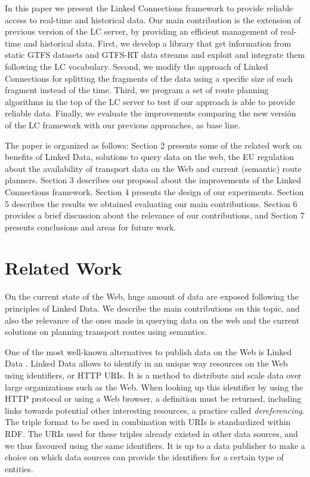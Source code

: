 \documentclass[sw]{iosart2x}
\begin{document}
In this paper we present the Linked Connections framework to provide reliable access to real-time and historical data. Our main contribution is the extension of previous version of the LC server, by providing an efficient management of real-time and historical data. First, we develop a library that get information from static GTFS datasets and GTFS-RT data streams and exploit and integrate them following the LC vocabulary. Second, we modify the approach of Linked Connections for splitting the fragments of the data using a specific size of each fragment instead of the time. Third, we program a set of route planning algorithms in the top of the LC server to test if our approach is able to provide reliable data. Finally, we evaluate the improvements comparing the new versión of the LC framework with our previous approaches, as base line.

The paper is organized as follows: Section 2 presents some of the related work on benefits of Linked Data, solutions to query data on the web, the EU regulation about the availability of transport data on the Web and current (semantic) route planners. Section 3 describes our proposal about the improvements of the Linked Connections framework. Section 4 presents the design of our experiments. Section 5 describes the results we obtained evaluating our main contributions. Section 6 provides a brief discussion about the relevance of our contributions, and Section 7 presents conclusions and areas for future work.



\section{Related Work}\label{related_work} %
On the current state of the Web, huge amount of data are exposed following the principles of Linked Data. We describe the main contributions on this topic, and also the relevance of the ones made in querying data on the web and the current solutions on planning transport routes using semantics.

One of the most well-known alternatives to publish data on the Web is Linked Data \cite{bizer2009linked}. Linked Data allows to identify in an unique way resources on the Web using identifiers, or HTTP URIs. It is a method to distribute and scale data over large organizations such as the Web. When looking up this identifier by using the HTTP protocol or using a Web browser, a definition must be returned, including links towards potential other interesting resources, a practice called \textit{dereferencing}. The triple format to be used in combination with URIs is standardized within RDF. The URIs used for these triples already existed in other data sources, and we thus favoured using the same identifiers. It is up to a data publisher to make a choice on which data sources can provide the identifiers for a certain type of entities. 
\end{document}
